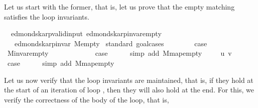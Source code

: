 \begin{isabellebody}
\begin{isamarkuptext}
Let us start with the former, that is, let us prove that the empty matching satisfies the loop
invariants.%
\end{isamarkuptext}\isamarkuptrue%
\isamarkupfalse%
\ {\isacharparenleft}{\kern0pt}\ edmonds{\isacharunderscore}{\kern0pt}karp{\isacharunderscore}{\kern0pt}valid{\isacharunderscore}{\kern0pt}input{\isacharparenright}{\kern0pt}\ edmonds{\isacharunderscore}{\kern0pt}karp{\isacharunderscore}{\kern0pt}invar{\isacharunderscore}{\kern0pt}empty{\isacharcolon}{\kern0pt}\isanewline
\ \ \ {\isachardoublequoteopen}edmonds{\isacharunderscore}{\kern0pt}karp{\isacharunderscore}{\kern0pt}invar{\isacharprime}{\kern0pt}{\isacharprime}{\kern0pt}\ M{\isacharunderscore}{\kern0pt}empty{\isachardoublequoteclose}\isanewline
%
\isadelimproof
%
\endisadelimproof
%
\isatagproof
{}\isamarkupfalse%
\ {\isacharparenleft}{\kern0pt}standard{\isacharcomma}{\kern0pt}\ goal{\isacharunderscore}{\kern0pt}cases{\isacharparenright}{\kern0pt}\isanewline
\ \ \isamarkupfalse%
\ {}\isanewline
\ \ \isamarkupfalse%
\ {\isacharquery}{\kern0pt}case\isanewline
\ \ \ \ \isamarkupfalse%
\ M{\isachardot}{\kern0pt}invar{\isacharunderscore}{\kern0pt}empty\isanewline
\ \ \ \ \isacommand{{\isachardot}{\kern0pt}}\isamarkupfalse%
\isanewline
{}\isamarkupfalse%
\isanewline
\ \ \isamarkupfalse%
\ {}\isanewline
\ \ \isamarkupfalse%
\ {\isacharquery}{\kern0pt}case\isanewline
\ \ \ \ \isamarkupfalse%
\ {\isacharparenleft}{\kern0pt}simp\ add{\isacharcolon}{\kern0pt}\ M{\isachardot}{\kern0pt}map{\isacharunderscore}{\kern0pt}empty{\isacharparenright}{\kern0pt}\isanewline
{}\isamarkupfalse%
\isanewline
\ \ \isamarkupfalse%
\ {\isacharparenleft}{\kern0pt}{}\ u\ v{\isacharparenright}{\kern0pt}\isanewline
\ \ \isamarkupfalse%
\ {\isacharquery}{\kern0pt}case\isanewline
\ \ \ \ \isamarkupfalse%
\ {\isacharparenleft}{\kern0pt}simp\ add{\isacharcolon}{\kern0pt}\ M{\isachardot}{\kern0pt}map{\isacharunderscore}{\kern0pt}empty{\isacharparenright}{\kern0pt}\isanewline
{}\isamarkupfalse%
%
\endisatagproof
{\isafoldproof}%
%
\isadelimproof
%
\endisadelimproof
%
\begin{isamarkuptext}%
Let us now verify that the loop invariants are maintained, that is, if they hold at the start of an
iteration of loop , then they will also hold at the end. For this, we
verify the correctness of the body of the loop, that is,


\end{isamarkuptext}
\end{isabellebody}
